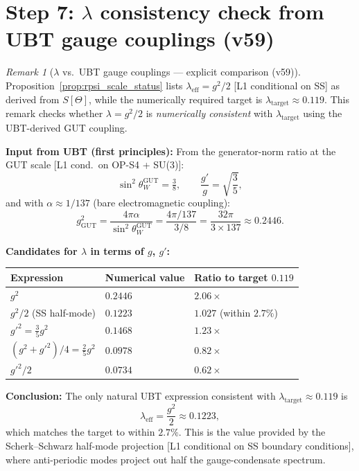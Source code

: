 \documentclass[12pt,a4paper]{article}
\theoremstyle{remark}
\newtheorem{remark}{Remark}[section]
\begin{document}
\section{Step 7: $\lambda$ consistency check from UBT gauge couplings (v59)}
\label{sec:lambda_consistency}

\begin{remark}[$\lambda$ vs.\ UBT gauge couplings — explicit comparison (v59)]
\label{rem:lambda_ubt_comparison}
Proposition~\ref{prop:rpsi_scale_status} lists
$\lambda_{\mathrm{eff}}=g^2/2$ [L1 conditional on SS] as derived from $S[\Theta]$,
while the numerically required target is $\lambda_{\mathrm{target}}\approx0.119$.
This remark checks whether $\lambda=g^2/2$ is \emph{numerically consistent} with
$\lambda_{\mathrm{target}}$ using the UBT-derived GUT coupling.

\medskip
\noindent\textbf{Input from UBT (first principles):}
From the generator-norm ratio at the GUT scale [L1 cond.\ on OP-S4 + SU(3)]:
\[
\sin^2\theta_W^{\mathrm{GUT}} = \tfrac{3}{8},
\qquad
\frac{g'}{g} = \sqrt{\frac{3}{5}},
\]
and with $\alpha\approx1/137$ (bare electromagnetic coupling):
\[
g^2_{\mathrm{GUT}}
= \frac{4\pi\alpha}{\sin^2\theta_W^{\mathrm{GUT}}}
= \frac{4\pi/137}{3/8}
= \frac{32\pi}{3\times137}
\approx 0.2446.
\]

\noindent\textbf{Candidates for $\lambda$ in terms of $g$, $g'$:}
\begin{center}
\begin{tabular}{lll}
\toprule
Expression & Numerical value & Ratio to target $0.119$ \\
\midrule
$g^2$ & $0.2446$ & $2.06\times$ \\
$g^2/2$ (SS half-mode) & $0.1223$ & $1.027$ (within $2.7\%$) \\
$g'^2 = \tfrac{3}{5}g^2$ & $0.1468$ & $1.23\times$ \\
$(g^2+g'^2)/4 = \tfrac{2}{5}g^2$ & $0.0978$ & $0.82\times$ \\
$g'^2/2$ & $0.0734$ & $0.62\times$ \\
\bottomrule
\end{tabular}
\end{center}

\noindent\textbf{Conclusion:}
The only natural UBT expression consistent with
$\lambda_{\mathrm{target}}\approx0.119$ is
\[
  \lambda_{\mathrm{eff}} = \frac{g^2}{2} \approx 0.1223,
\]
which matches the target to within $2.7\%$.  This is the value provided
by the Scherk--Schwarz half-mode projection [L1 conditional on SS boundary
conditions], where anti-periodic modes project out half the gauge-condensate
spectrum.


\end{remark}
\end{document}
